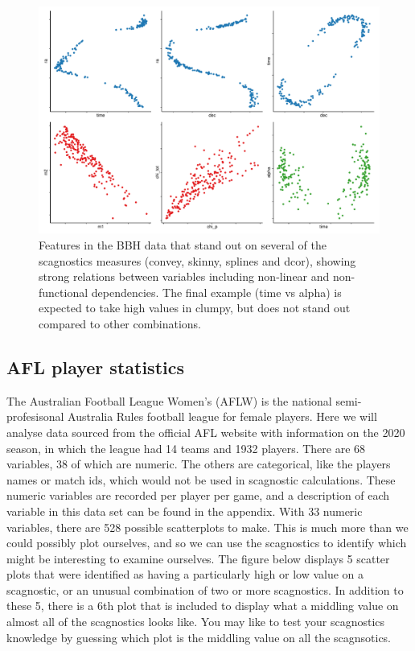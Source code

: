 \begin{Schunk}
\begin{figure}
\includegraphics[width=1\linewidth]{mason-lee-laa-cook_files/figure-latex/blackholes-1} \caption[Features in the BBH data that stand out on several of the scagnostics measures (convey, skinny, splines and dcor), showing strong relations between variables including non-linear and non-functional dependencies]{Features in the BBH data that stand out on several of the scagnostics measures (convey, skinny, splines and dcor), showing strong relations between variables including non-linear and non-functional dependencies. The final example (time vs alpha) is expected to take high values in clumpy, but does not stand out compared to other combinations.}\label{fig:blackholes}
\end{figure}
\end{Schunk}

\hypertarget{afl-player-statistics}{%
\subsection{AFL player statistics}\label{afl-player-statistics}}

The Australian Football League Women's (AFLW) is the national
semi-profesisonal Australia Rules football league for female players.
Here we will analyse data sourced from the official AFL website with
information on the 2020 season, in which the league had 14 teams and
1932 players. There are 68 variables, 38 of which are numeric. The
others are categorical, like the players names or match ids, which would
not be used in scagnostic calculations. These numeric variables are
recorded per player per game, and a description of each variable in this
data set can be found in the appendix. With 33 numeric variables, there
are 528 possible scatterplots to make. This is much more than we could
possibly plot ourselves, and so we can use the scagnostics to identify
which might be interesting to examine ourselves. The figure below
displays 5 scatter plots that were identified as having a particularly
high or low value on a scagnostic, or an unusual combination of two or
more scagnostics. In addition to these 5, there is a 6th plot that is
included to display what a middling value on almost all of the
scagnostics looks like. You may like to test your scagnostics knowledge
by guessing which plot is the middling value on all the scagnsotics.

